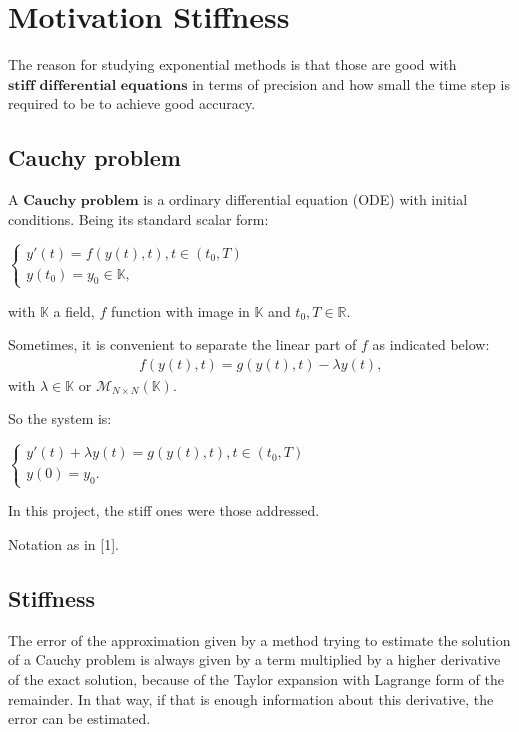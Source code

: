 \documentclass[letterpaper,10pt,english]{jupyterBook}
\begin{document}
\section{Motivation \sphinxhyphen{} Stiffness}
\label{\detokenize{cap1:motivation-stiffness}}\label{\detokenize{cap1::doc}}
\sphinxAtStartPar
The reason for studying exponential methods is that those are good with \(\textbf{stiff differential equations}\) in terms of precision and how small the time step is required to be to achieve good accuracy.


\subsection{Cauchy problem}
\label{\detokenize{cap1:cauchy-problem}}
\sphinxAtStartPar
A \(\textbf{Cauchy problem}\) is a ordinary differential equation (ODE) with initial conditions. Being its standard scalar form:

\sphinxAtStartPar
\(\begin{cases}
    y'(t) = f(y(t), t), t \in (t_0, T) \\
    y(t_0) = y_0 \in \mathbb{K} \text{,}
\end{cases}\)

\sphinxAtStartPar
with \(\mathbb{K}\) a field, \(f\) function with image in \(\mathbb{K}\) and \(t_0, T \in \mathbb{R}\).

\sphinxAtStartPar
Sometimes, it is convenient to separate the linear part of \(f\) as indicated below:
\begin{equation*}
\begin{split}
    f(y(t), t) = g(y(t), t) - \lambda y(t) \text{,}
\end{split}
\end{equation*}
\sphinxAtStartPar
with \(\lambda \in \mathbb{K}\) or \(\mathscr{M}_{N \times N}(\mathbb{K})\).

\sphinxAtStartPar
So the system is:

\sphinxAtStartPar
\(\begin{cases}
    y'(t) + \lambda y(t) = g(y(t), t), t \in (t_0, T) \\
    y(0) = y_0 
    \text{.}
\end{cases}\)

\sphinxAtStartPar
In this project, the stiff ones were those addressed.

\sphinxAtStartPar
Notation as in {[}1{]}.


\subsection{Stiffness}
\label{\detokenize{cap1:stiffness}}
\sphinxAtStartPar
The error of the approximation given by a method trying to estimate the solution of a Cauchy problem is always given by a term multiplied by a higher derivative of the exact solution, because of the Taylor expansion with Lagrange form of the remainder. In that way, if that is enough information about this derivative, the error can be estimated.
\end{document}
